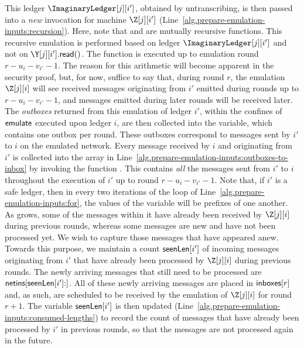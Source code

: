 This ledger $\ImaginaryLedger[j][i']$, obtained by untranscribing, is then passed into a
\emph{new} \emulate invocation for machine $\Z[j][i']$ (Line~\ref{alg.prepare-emulation-inputs:recursion}).
Here, note that \emulate and \prepareEmulationInputs are mutually recursive functions.
This recursive emulation is performed based on ledger $\ImaginaryLedger[j][i']$ and not
on $\Y[j][i'].\lread()$. The \emulate function is executed up to emulation round
$r - u_i - v_{i'} - 1$. The reason for this arithmetic will become apparent in the security proof,
but, for now, suffice to say that, during round $r$, the emulation $\Z[j][i]$ will see received messages
originating from $i'$ emitted during rounds up to $r - u_i - v_{i'} - 1$,
and messages emitted during later rounds will be received later.
The \emph{outboxes} returned from this emulation of ledger $i'$, within the confines of $\textsf{emulate}$
executed upon ledger $i$, are then collected into the \outboxes variable, which contains one outbox
per round. These outboxes correspond to messages sent by $i'$ to $i$ on the emulated network.
Every message received by $i$
and originating from $i'$ is collected into the array \netins in
Line~\ref{alg.prepare-emulation-inputs:outboxes-to-inbox} by invoking the function \outboxesToInbox.
This \netins contains \emph{all} the messages sent from $i'$ to $i$ throughout the execution
of $i'$ up to round $r - u_i - v_{i'} - 1$. Note that, if $i'$ is a safe ledger, then in every
two iterations of the loop of Line~\ref{alg.prepare-emulation-inputs:for},
the values of the variable \netins will be prefixes of one another.
As \netins grows, some of the messages within it have already been received
by $\Z[j][i]$ during previous rounds, whereas some messages are new and have not
been processed yet. We wish to capture those messages that have appeared anew.
Towards this purpose, we maintain a count $\textsf{seenLen}[i']$ of incoming messages originating from $i'$
that have already been processed by $\Z[j][i]$ during previous rounds.
The newly arriving messages that still need to be processed are $\textsf{netins}[\textsf{seenLen}[i']{:}]$.
All of these newly arriving messages are placed in $\textsf{inboxes}[r]$ and, as such,
are scheduled to be received by the emulation of $\Z[j][i]$ for round $r + 1$.
The variable $\textsf{seenLen}[i']$ is then updated (Line~\ref{alg.prepare-emulation-inputs:consumed-lengths})
to record the count of messages that have already been processed by $i'$ in
previous rounds, so that the messages are not processed again in the future.


